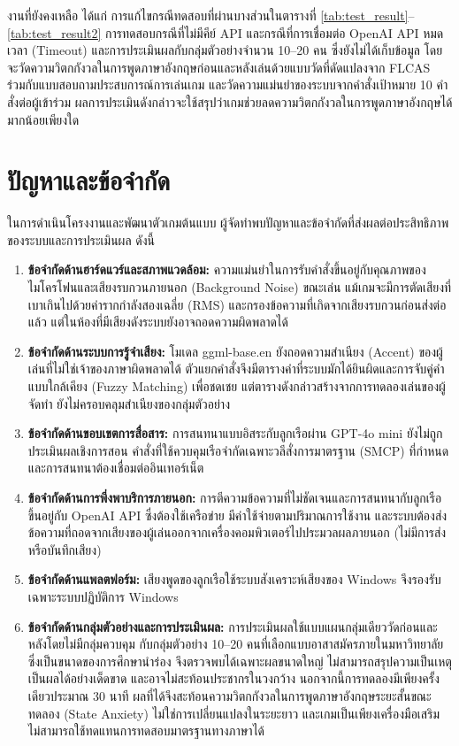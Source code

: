 งานที่ยังคงเหลือ ได้แก่ การแก้ไขกรณีทดสอบที่ผ่านบางส่วนในตารางที่ \ref{tab:test_result}--\ref{tab:test_result2} การทดสอบกรณีที่ไม่มีคีย์ API และกรณีที่การเชื่อมต่อ OpenAI API หมดเวลา (Timeout) และการประเมินผลกับกลุ่มตัวอย่างจำนวน 10--20 คน ซึ่งยังไม่ได้เก็บข้อมูล โดยจะวัดความวิตกกังวลในการพูดภาษาอังกฤษก่อนและหลังเล่นด้วยแบบวัดที่ดัดแปลงจาก FLCAS~\cite{horwitz1986} ร่วมกับแบบสอบถามประสบการณ์การเล่นเกม และวัดความแม่นยำของระบบจากคำสั่งเป้าหมาย 10 คำสั่งต่อผู้เข้าร่วม ผลการประเมินดังกล่าวจะใช้สรุปว่าเกมช่วยลดความวิตกกังวลในการพูดภาษาอังกฤษได้มากน้อยเพียงใด

\section{ปัญหาและข้อจำกัด}

ในการดำเนินโครงงานและพัฒนาตัวเกมต้นแบบ ผู้จัดทำพบปัญหาและข้อจำกัดที่ส่งผลต่อประสิทธิภาพของระบบและการประเมินผล ดังนี้

\begin{enumerate}[label=\arabic*)]
    \item \textbf{ข้อจำกัดด้านฮาร์ดแวร์และสภาพแวดล้อม:} ความแม่นยำในการรับคำสั่งขึ้นอยู่กับคุณภาพของไมโครโฟนและเสียงรบกวนภายนอก (Background Noise) ขณะเล่น แม้เกมจะมีการตัดเสียงที่เบาเกินไปด้วยค่ารากกำลังสองเฉลี่ย (RMS) และกรองข้อความที่เกิดจากเสียงรบกวนก่อนส่งต่อแล้ว แต่ในห้องที่มีเสียงดังระบบยังอาจถอดความผิดพลาดได้
    \item \textbf{ข้อจำกัดด้านระบบการรู้จำเสียง:} โมเดล ggml-base.en ยังถอดความสำเนียง (Accent) ของผู้เล่นที่ไม่ใช่เจ้าของภาษาผิดพลาดได้ ตัวแยกคำสั่งจึงมีตารางคำที่ระบบมักได้ยินผิดและการจับคู่คำแบบใกล้เคียง (Fuzzy Matching) เพื่อชดเชย แต่ตารางดังกล่าวสร้างจากการทดลองเล่นของผู้จัดทำ ยังไม่ครอบคลุมสำเนียงของกลุ่มตัวอย่าง
    \item \textbf{ข้อจำกัดด้านขอบเขตการสื่อสาร:} การสนทนาแบบอิสระกับลูกเรือผ่าน GPT-4o mini ยังไม่ถูกประเมินผลเชิงการสอน คำสั่งที่ใช้ควบคุมเรือจำกัดเฉพาะวลีสั่งการมาตรฐาน (SMCP) ที่กำหนด และการสนทนาต้องเชื่อมต่ออินเทอร์เน็ต
    \item \textbf{ข้อจำกัดด้านการพึ่งพาบริการภายนอก:} การตีความข้อความที่ไม่ชัดเจนและการสนทนากับลูกเรือขึ้นอยู่กับ OpenAI API ซึ่งต้องใช้เครือข่าย มีค่าใช้จ่ายตามปริมาณการใช้งาน และระบบต้องส่งข้อความที่ถอดจากเสียงของผู้เล่นออกจากเครื่องคอมพิวเตอร์ไปประมวลผลภายนอก (ไม่มีการส่งหรือบันทึกเสียง)
    \item \textbf{ข้อจำกัดด้านแพลตฟอร์ม:} เสียงพูดของลูกเรือใช้ระบบสังเคราะห์เสียงของ Windows จึงรองรับเฉพาะระบบปฏิบัติการ Windows
    \item \textbf{ข้อจำกัดด้านกลุ่มตัวอย่างและการประเมินผล:} การประเมินผลใช้แบบแผนกลุ่มเดียววัดก่อนและหลังโดยไม่มีกลุ่มควบคุม กับกลุ่มตัวอย่าง 10--20 คนที่เลือกแบบอาสาสมัครภายในมหาวิทยาลัย ซึ่งเป็นขนาดของการศึกษานำร่อง จึงตรวจพบได้เฉพาะผลขนาดใหญ่ ไม่สามารถสรุปความเป็นเหตุเป็นผลได้อย่างเด็ดขาด และอาจไม่สะท้อนประชากรในวงกว้าง นอกจากนี้การทดลองมีเพียงครั้งเดียวประมาณ 30 นาที ผลที่ได้จึงสะท้อนความวิตกกังวลในการพูดภาษาอังกฤษระยะสั้นขณะทดลอง (State Anxiety) ไม่ใช่การเปลี่ยนแปลงในระยะยาว และเกมเป็นเพียงเครื่องมือเสริม ไม่สามารถใช้ทดแทนการทดสอบมาตรฐานทางภาษาได้
\end{enumerate}

